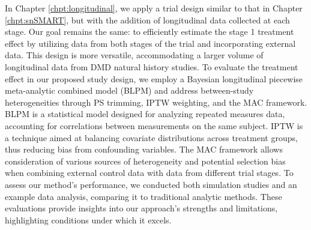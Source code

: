 In Chapter \ref{chpt:longitudinal}, we apply a trial design similar to that in Chapter \ref{chpt:snSMART}, but with the addition of longitudinal data collected at each stage. Our goal remains the same: to efficiently estimate the stage 1 treatment effect by utilizing data from both stages of the trial and incorporating external data. This design is more versatile, accommodating a larger volume of longitudinal data from \ac{DMD} natural history studies. To evaluate the treatment effect in our proposed study design, we employ a Bayesian longitudinal piecewise meta-analytic combined model (\ac{BLPM}) and address between-study heterogeneities through \ac{PS} trimming, \ac{IPTW} weighting, and the \ac{MAC} framework. \ac{BLPM} is a statistical model designed for analyzing repeated measures data, accounting for correlations between measurements on the same subject. \ac{IPTW} is a technique aimed at balancing covariate distributions across treatment groups, thus reducing bias from confounding variables. The \ac{MAC} framework allows consideration of various sources of heterogeneity and potential selection bias when combining external control data with data from different trial stages. To assess our method's performance, we conducted both simulation studies and an example data analysis, comparing it to traditional analytic methods. These evaluations provide insights into our approach's strengths and limitations, highlighting conditions under which it excels.

